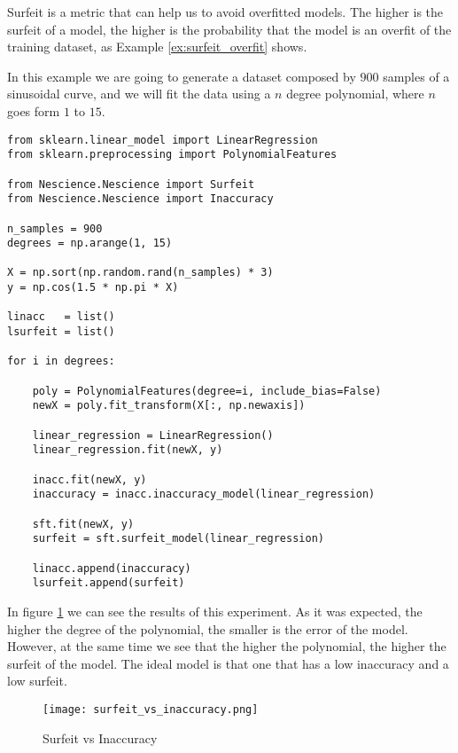 Surfeit is a metric that can help us to avoid overfitted models. The higher is the surfeit of a model, the higher is the probability that the model is an overfit of the training dataset, as Example \ref{ex:surfeit_overfit} shows.

\begin{example}
\label{ex:surfeit_overfit}
In this example we are going to generate a dataset composed by $900$ samples of a sinusoidal curve, and we will fit the data using a $n$ degree polynomial, where $n$ goes form $1$ to $15$.

\begin{sourcecode}
{\scriptsize \begin{verbatim}
from sklearn.linear_model import LinearRegression
from sklearn.preprocessing import PolynomialFeatures

from Nescience.Nescience import Surfeit
from Nescience.Nescience import Inaccuracy

n_samples = 900
degrees = np.arange(1, 15)

X = np.sort(np.random.rand(n_samples) * 3)
y = np.cos(1.5 * np.pi * X)

linacc   = list()
lsurfeit = list()

for i in degrees:
        
    poly = PolynomialFeatures(degree=i, include_bias=False)
    newX = poly.fit_transform(X[:, np.newaxis])
    
    linear_regression = LinearRegression()
    linear_regression.fit(newX, y)

    inacc.fit(newX, y)
    inaccuracy = inacc.inaccuracy_model(linear_regression)
    
    sft.fit(newX, y)
    surfeit = sft.surfeit_model(linear_regression)
    
    linacc.append(inaccuracy)
    lsurfeit.append(surfeit)
\end{verbatim}}
\end{sourcecode}

In figure \ref{figure:surfeit_vs_inaccuracy} we can see the results of this experiment. As it was expected, the higher the degree of the polynomial, the smaller is the error of the model. However, at the same time we see that the higher the polynomial, the higher the surfeit of the model. The ideal model is that one that has a low inaccuracy and a low surfeit.

\begin{figure}[h]
\centering
\texttt{[image: surfeit\_vs\_inaccuracy.png]}
\caption{Surfeit vs Inaccuracy}
\label{figure:surfeit_vs_inaccuracy}
\end{figure}

\end{example}


